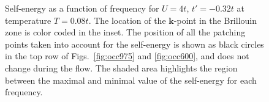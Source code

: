 \begin{figure}[tbh]
  \caption{Self-energy as a function of frequency for $U=4t$, $t'=-0.32t$ at  temperature $T=0.08t$.
The location of the $\mathbf{k}$-point in the Brillouin zone is color coded in the inset. The position of all the patching points taken into account for the self-energy is shown as black circles in the top row of Figs.~\ref{fig:occ975} and \ref{fig:occ600}, and does not change during the flow.
The shaded area highlights the region between the maximal and minimal value of the self-energy for each frequency. }
  \label{fig:selffermi}
\end{figure}
